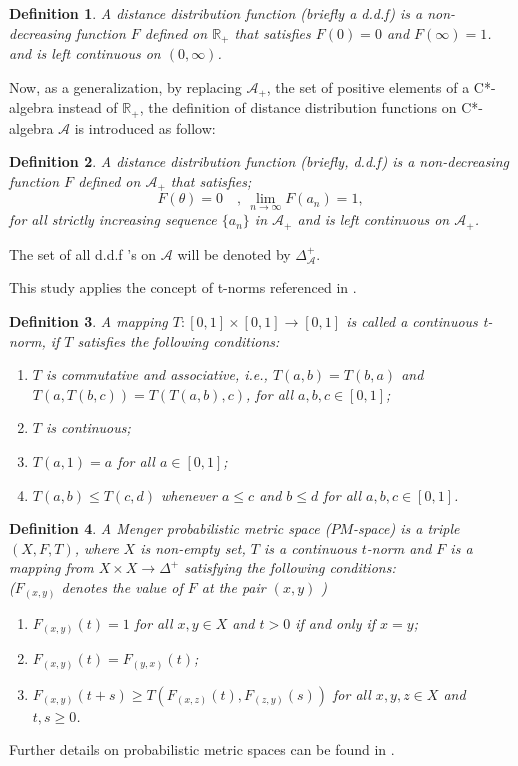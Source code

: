 \documentclass{amsart}%
\theoremstyle{plain}
\newtheorem{definition}{Definition}
\numberwithin{equation}{section}
\begin{document}
\begin{definition}
	\cite{Sh.Skalar} A {\em distance distribution function} (briefly a {\em d.d.f}) is a non-decreasing function $F$ defined on $\mathbb{R}_+$ that satisfies $F(0)=0$ and $F(\infty)=1$. and is left continuous on $(0,\infty)$. 
\end{definition}
Now, as a generalization, by replacing $\mathcal{A}_+$, the set of positive elements of a C*-algebra instead of $\mathbb{R}_+$, the definition of distance distribution functions on C*-algebra $\mathcal{A}$ is introduced as follow:
\begin{definition}\label{ddf}
	A {\em distance distribution function} (briefly, {\em d.d.f}) is a non-decreasing function $F$ defined on $\mathcal{A}_+$ that satisfies;
	$$F(\theta)=0 \quad , \ \lim_{n\to \infty}F(a_n)=1,$$
	for all strictly increasing sequence $\{a_n\}$ in $\mathcal{A}_+$
	and is left continuous on $\mathcal{A}_+$. 
\end{definition}
The set of all d.d.f 's on $\mathcal{A}$ will be denoted by $\Delta^+_{\mathcal{A}}$.

This study applies the concept of t-norms referenced in \cite{klement2013triangular, Schweizer}.
\begin{definition}\label{DT}
	A mapping  $T:[0,1]\times [0,1] \to [0,1]$ is called a {\em continuous t-norm}, if $T$ satisfies the following conditions:
	\begin{enumerate}
		\item $T$ is commutative and associative, i.e., $T(a,b)=T(b,a)$  and $T(a,T(b,c))=T(T(a,b),c)$, for all $a,b,c\in [0,1]$;
		\item $T$ is continuous;
		\item $T(a,1)=a$ for all $a\in [0,1]$;
		\item $T(a,b)\leq T(c,d)$ whenever $a\leq c$ and $b\leq d$ for all $a,b,c\in [0,1]$.
	\end{enumerate}
\end{definition}
\begin{definition}
	\cite{Schweizer} A Menger probabilistic metric space ($PM$-space) is a triple $(X,F,T)$, where $X$ is non-empty set, $T$ is a continuous $t$-norm and $F$ is a mapping from $X\times X\to \Delta^+$ satisfying the following conditions:\\
	($F_{(x,y)}$ denotes the value of $F$ at the pair $(x,y)$ )
	\begin{enumerate}
		\item $F_{(x,y)}(t)=1$ for all $x,y\in X$ and $t>0$ if and only if $x=y$;
		\item $F_{(x,y)}(t)=F_{(y,x)}(t)$;
		\item $F_{(x,y)}(t+s)\geq T\left(F_{(x,z)}(t), F_{(z,y)}(s)\right)$ for all $x,y,z\in X$ and $t,s\geq0$.
	\end{enumerate}
\end{definition}
Further details on probabilistic metric spaces can be found in \cite{huang2023fixed,NARUKAWA2023108528}.
\end{document}
